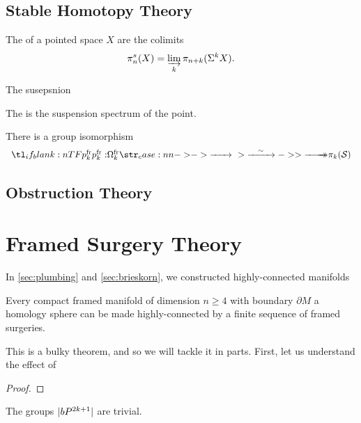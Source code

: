\subsection{Stable Homotopy Theory}

\begin{definition}
	The  of a pointed space $X$ are the colimits
	\[
		\pi_n^{s}(X) = \varinjlim_k \pi_{n+k}(\Sigma^k X).
	\]
\end{definition}

\begin{definition}
	The susepsnion 
\end{definition}

\begin{definition}
	The  is the suspension spectrum of the point.
\end{definition}

\begin{theorem}
	There is a group isomorphism
	\[
		\lkxfunc{p^\fr_k}{\Omega_k^\fr}{\pi_k(\mathcal{S})}
	\]
\end{theorem}

\subsection{Obstruction Theory}

\pagebreak
\section{Framed Surgery Theory}

In \cref{sec:plumbing} and \cref{sec:brieskorn}, we constructed highly-connected manifolds

\begin{theorem}\label{thm:framed-surgery-highly-connected}
  Every compact framed manifold of dimension $n\geq 4$ with boundary $\partial M$ a homology sphere can be made highly-connected by a finite sequence of framed surgeries.
\end{theorem}

This is a bulky theorem, and so we will tackle it in parts. First, let us understand the effect of 

\begin{proof}
\end{proof}

\begin{corollary}\label{cor:odd-dimensional-bP-trivial}
	The groups $|bP^{2k+1}|$ are trivial.
\end{corollary}

